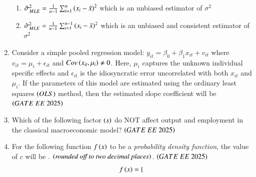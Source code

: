 \documentclass[journal,12pt,onecolumn]{IEEEtran}
\theoremstyle{remark}
\begin{document}
\begin{enumerate}
\begin{enumerate}
    \item $\hat{\sigma}_{MLE}^2 = \frac{1}{n-1}\sum_{i=1}^{n} \left(x_i-\bar{x}\right)^2$ which is an unbiased estimator of $\sigma^2$
    \item $\hat{\sigma}_{MLE}^2 = \frac{1}{n-1}\sum_{i=1}^{n-1} \left(x_i-\bar{x}\right)^2$ which is an unbiased and consistent estimator of $\sigma^2$
  \end{enumerate}
\item Consider a simple pooled regression model: $y_{it} = \beta_0 + \beta_1 x_{it} + v_{it}$ where $v_{it} = \mu_i + \epsilon_{it}$ and $Cov \left(x_{it},\mu_{i}\right) \neq 0$. Here, $\mu_{i}$ captures the unknown individual specific effects and $\epsilon_{it}$ is the idiosyncratic error uncorrelated with both $x_{it}$ and $\mu_{i}$. If the parameters of this model are estimated using the ordinary least squares  $\left(OLS\right)$ method, then the estimated slope coefficient will be
\hfill $\brak{GATE\ EE\ 2025}$
    \begin{enumerate}
      \end{enumerate}
\item Which of the following factor $\left(s\right)$ do NOT affect output and employment in the classical macroeconomic model?
\hfill $\brak{GATE\ EE\ 2025}$
    \begin{enumerate}
      \end{enumerate}
\item For the following function $f \left(x\right)$ to be a \textit{probability density function}, the value of $c$ will be \underline{\hspace{2cm}}.  $\left(\textit{rounded off to two decimal places}\right)$.
\hfill $\brak{GATE\ EE\ 2025}$  
\begin{align} 
f \left(x\right) =
  \begin{cases}

\end{cases}
\end{align}
\end{enumerate}
\end{document}
